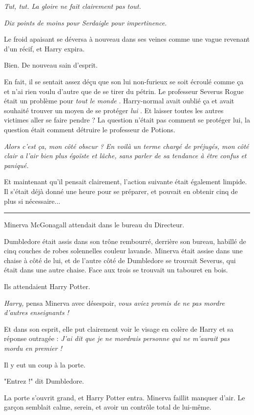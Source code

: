 \emph{Tut, tut. La gloire ne fait clairement pas tout.} 

\emph{Dix points de moins pour Serdaigle pour impertinence.} 

Le froid apaisant se déversa à nouveau dans ses veines comme une vague revenant d'un récif, et Harry expira.

Bien. De nouveau sain d'esprit.

En fait, il se sentait assez déçu que son lui non-furieux se soit écroulé comme ça et n'ai rien voulu d'autre que de se tirer du pétrin. Le professeur Severus Rogue était un problème pour \emph{tout le monde} . Harry-normal avait oublié ça et avait souhaité trouver un moyen de se protéger \emph{lui} . Et laisser toutes les autres victimes aller se faire pendre ? La question n'était pas comment se protéger lui, la question était comment détruire le professeur de Potions.

\emph{Alors c'est ça, mon côté obscur ? En voilà un terme chargé de préjugés, mon côté clair a l'air bien plus égoïste et lâche, sans parler de sa tendance à être confus et paniqué.} 

Et maintenant qu'il pensait clairement, l'action suivante était également limpide. Il s'était déjà donné une heure pour se préparer, et pouvait en obtenir cinq de plus si nécessaire...
\par\noindent\rule{\textwidth}{0.4pt}
Minerva McGonagall attendait dans le bureau du Directeur.

Dumbledore était assis dans son trône rembourré, derrière son bureau, habillé de cinq couches de robes solennelles couleur lavande. Minerva était assise dans une chaise à côté de lui, et de l'autre côté de Dumbledore se trouvait Severus, qui était dans une autre chaise. Face aux trois se trouvait un tabouret en bois.

Ils attendaient Harry Potter.

\emph{Harry,}  pensa Minerva avec désespoir, \emph{vous aviez promis de ne pas mordre d'autres enseignants !} 

Et dans son esprit, elle put clairement voir le visage en colère de Harry et sa réponse outragée : \emph{J'ai dit que je ne mordrais personne qui ne m'aurait pas mordu en premier !} 

Il y eut un coup à la porte.

"Entrez !" dit Dumbledore.

La porte s'ouvrit grand, et Harry Potter entra. Minerva faillit manquer d'air. Le garçon semblait calme, serein, et avoir un contrôle total de lui-même.

